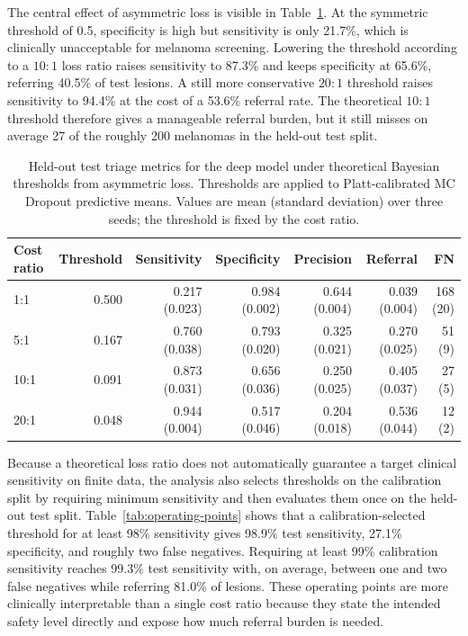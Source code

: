 \documentclass[11pt,a4paper]{article}
\begin{document}
The central effect of asymmetric loss is visible in Table~\ref{tab:thresholds}. At the symmetric threshold of 0.5, specificity is high but sensitivity is only 21.7\%, which is clinically unacceptable for melanoma screening. Lowering the threshold according to a $10:1$ loss ratio raises sensitivity to 87.3\% and keeps specificity at 65.6\%, referring 40.5\% of test lesions. A still more conservative $20:1$ threshold raises sensitivity to 94.4\% at the cost of a 53.6\% referral rate. The theoretical $10:1$ threshold therefore gives a manageable referral burden, but it still misses on average 27 of the roughly 200 melanomas in the held-out test split.

\begin{table}[htbp]
\centering
\caption{Held-out test triage metrics for the deep model under theoretical Bayesian thresholds from asymmetric loss. Thresholds are applied to Platt-calibrated MC Dropout predictive means. Values are mean (standard deviation) over three seeds; the threshold is fixed by the cost ratio.}
\label{tab:thresholds}
\small
\setlength{\tabcolsep}{5pt}
\begin{tabular}{lrrrrrr}
\toprule
Cost ratio & Threshold & Sensitivity & Specificity & Precision & Referral & FN \\
\midrule
1:1  & 0.500 & 0.217 (0.023) & 0.984 (0.002) & 0.644 (0.004) & 0.039 (0.004) & 168 (20) \\
5:1  & 0.167 & 0.760 (0.038) & 0.793 (0.020) & 0.325 (0.021) & 0.270 (0.025) & 51 (9) \\
10:1 & 0.091 & 0.873 (0.031) & 0.656 (0.036) & 0.250 (0.025) & 0.405 (0.037) & 27 (5) \\
20:1 & 0.048 & 0.944 (0.004) & 0.517 (0.046) & 0.204 (0.018) & 0.536 (0.044) & 12 (2) \\
\bottomrule
\end{tabular}
\end{table}

Because a theoretical loss ratio does not automatically guarantee a target clinical sensitivity on finite data, the analysis also selects thresholds on the calibration split by requiring minimum sensitivity and then evaluates them once on the held-out test split. Table~\ref{tab:operating-points} shows that a calibration-selected threshold for at least 98\% sensitivity gives 98.9\% test sensitivity, 27.1\% specificity, and roughly two false negatives. Requiring at least 99\% calibration sensitivity reaches 99.3\% test sensitivity with, on average, between one and two false negatives while referring 81.0\% of lesions. These operating points are more clinically interpretable than a single cost ratio because they state the intended safety level directly and expose how much referral burden is needed.
\end{document}
